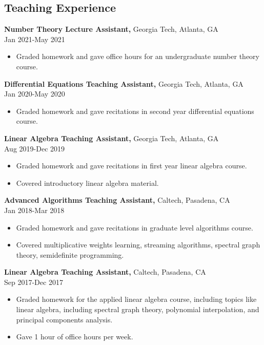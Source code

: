 \documentclass[margin]{res}
\begin{document}
\begin{resume}
\section{Teaching Experience}
{\bf Number Theory Lecture Assistant,} Georgia Tech, Atlanta, GA \\ Jan 2021-May 2021
\begin{itemize} \itemsep -2pt %
    \item Graded homework and gave office hours for an undergraduate number theory course.
\end{itemize}
{\bf Differential Equations Teaching Assistant,} Georgia Tech, Atlanta, GA \\ Jan 2020-May 2020
\begin{itemize} \itemsep -2pt %
    \item Graded homework and gave recitations in second year differential equations course.
\end{itemize}

{\bf Linear Algebra Teaching Assistant,} Georgia Tech, Atlanta, GA \\ Aug 2019-Dec 2019
\begin{itemize} \itemsep -2pt %
    \item Graded homework and gave recitations in first year linear algebra course.
    \item Covered introductory linear algebra material.
\end{itemize}
 
{\bf Advanced Algorithms Teaching Assistant,} Caltech, Pasadena, CA \\ Jan 2018-Mar 2018
\begin{itemize} \itemsep -2pt %
\item Graded homework and gave recitations in graduate level algorithms course.
\item Covered multiplicative weights learning, streaming algorithms,
spectral graph theory, semidefinite programming.
\end{itemize}
 
{\bf Linear Algebra Teaching Assistant,} Caltech, Pasadena, CA \\ Sep 2017-Dec 2017
\begin{itemize} \itemsep -2pt %
\item Graded homework for the applied linear algebra course, including topics like linear algebra, including spectral graph theory, polynomial
interpolation, and principal components analysis.
\item Gave 1 hour of office hours per week.
\end{itemize}
 

\end{resume}
\end{document}
